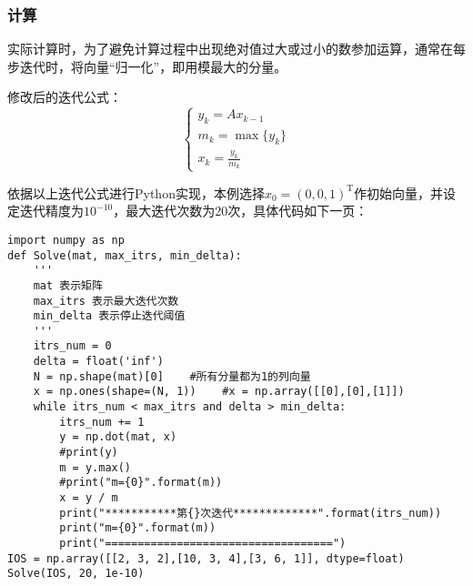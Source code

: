 \documentclass[UTF8]{ctexart}
\begin{document}
    \subsubsection{计算}
    实际计算时，为了避免计算过程中出现绝对值过大或过小的数参加运算，通常在每步迭代时，将向量“归一化”，即用模最大的分量。

    修改后的迭代公式：
    \[\begin{cases}
        y_k=Ax_{k-1}\\m_k=\max\{y_k\}\\\displaystyle x_k=\frac{y_k}{m_k}
    \end{cases}\]

    依据以上迭代公式进行Python实现，本例选择$x_0=(0,0,1)^{\mathrm{T}}$作初始向量，并设定迭代精度为$10^{-10}$，最大迭代次数为20次，具体代码如下一页：
    \clearpage
    \begin{lstlisting}
import numpy as np
def Solve(mat, max_itrs, min_delta):
    '''
    mat 表示矩阵
    max_itrs 表示最大迭代次数
    min_delta 表示停止迭代阈值
    '''
    itrs_num = 0
    delta = float('inf')
    N = np.shape(mat)[0]    #所有分量都为1的列向量
    x = np.ones(shape=(N, 1))    #x = np.array([[0],[0],[1]])
    while itrs_num < max_itrs and delta > min_delta:
        itrs_num += 1
        y = np.dot(mat, x)
        #print(y)
        m = y.max()
        #print("m={0}".format(m))
        x = y / m
        print("***********第{}次迭代*************".format(itrs_num))
        print("m={0}".format(m))
        print("===================================")
IOS = np.array([[2, 3, 2],[10, 3, 4],[3, 6, 1]], dtype=float)
Solve(IOS, 20, 1e-10)
    \end{lstlisting}
\end{document}
